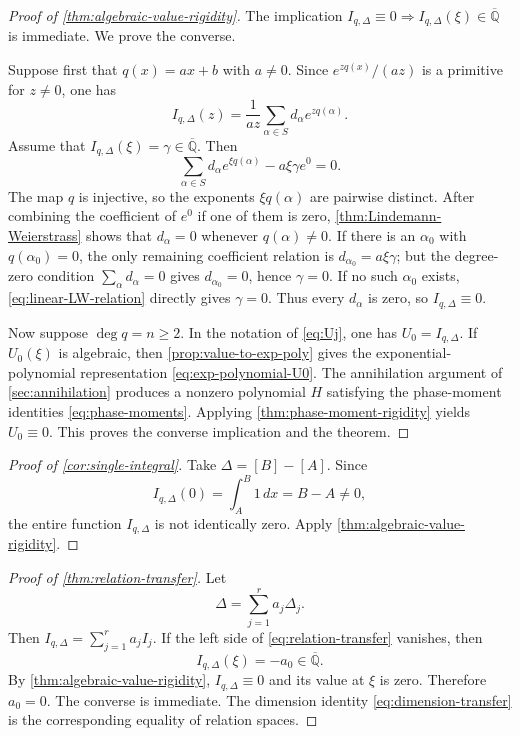 \documentclass[11pt]{article}
\numberwithin{equation}{section}
\theoremstyle{definition}
\theoremstyle{remark}
\newcommand{\Qbar}{\overline{\mathbb Q}}
\begin{document}
\begin{proof}[Proof of \cref{thm:algebraic-value-rigidity}]
The implication
$I_{q,\Delta}\equiv0\Rightarrow I_{q,\Delta}(\xi)\in\Qbar$ is immediate.
We prove the converse.

Suppose first that $q(x)=ax+b$ with $a\ne0$.  Since
$e^{zq(x)}/(az)$ is a primitive for $z\ne0$, one has
\begin{equation}\label{eq:linear-phase-divisor}
  I_{q,\Delta}(z)
  =\frac1{az}\sum_{\alpha\in S}d_\alpha e^{zq(\alpha)}.
\end{equation}
Assume that $I_{q,\Delta}(\xi)=\gamma\in\Qbar$.  Then
\begin{equation}\label{eq:linear-LW-relation}
  \sum_{\alpha\in S}d_\alpha e^{\xi q(\alpha)}
  -a\xi\gamma e^0=0.
\end{equation}
The map $q$ is injective, so the exponents $\xi q(\alpha)$ are pairwise
distinct.  After combining the coefficient of $e^0$ if one of them is zero,
\cref{thm:Lindemann-Weierstrass} shows that $d_\alpha=0$ whenever
$q(\alpha)\ne0$.  If there is an $\alpha_0$ with $q(\alpha_0)=0$, the only
remaining coefficient relation is
$d_{\alpha_0}=a\xi\gamma$; but the degree-zero condition
$\sum_\alpha d_\alpha=0$ gives $d_{\alpha_0}=0$, hence $\gamma=0$.
If no such $\alpha_0$ exists, \eqref{eq:linear-LW-relation} directly gives
$\gamma=0$.  Thus every $d_\alpha$ is zero, so
$I_{q,\Delta}\equiv0$.

Now suppose $\deg q=n\ge2$.  In the notation of \eqref{eq:Uj}, one has
$U_0=I_{q,\Delta}$.  If $U_0(\xi)$ is algebraic, then
\cref{prop:value-to-exp-poly} gives the exponential-polynomial representation
\eqref{eq:exp-polynomial-U0}.  The annihilation argument of
\cref{sec:annihilation} produces a nonzero polynomial $H$ satisfying the
phase-moment identities \eqref{eq:phase-moments}.  Applying
\cref{thm:phase-moment-rigidity} yields $U_0\equiv0$.  This proves the
converse implication and the theorem.
\end{proof}

\begin{proof}[Proof of \cref{cor:single-integral}]
Take $\Delta=[B]-[A]$.  Since
\[
  I_{q,\Delta}(0)=\int_A^B1\,dx=B-A\ne0,
\]
the entire function $I_{q,\Delta}$ is not identically zero.  Apply
\cref{thm:algebraic-value-rigidity}.
\end{proof}

\begin{proof}[Proof of \cref{thm:relation-transfer}]
Let
\[
  \Delta=\sum_{j=1}^r a_j\Delta_j.
\]
Then $I_{q,\Delta}=\sum_{j=1}^r a_jI_j$.  If the left side of
\eqref{eq:relation-transfer} vanishes, then
\[
  I_{q,\Delta}(\xi)=-a_0\in\Qbar.
\]
By \cref{thm:algebraic-value-rigidity}, $I_{q,\Delta}\equiv0$ and its value at
$\xi$ is zero.  Therefore $a_0=0$.  The converse is immediate.  The dimension
identity \eqref{eq:dimension-transfer} is the corresponding equality of
relation spaces.
\end{proof}
\end{document}
